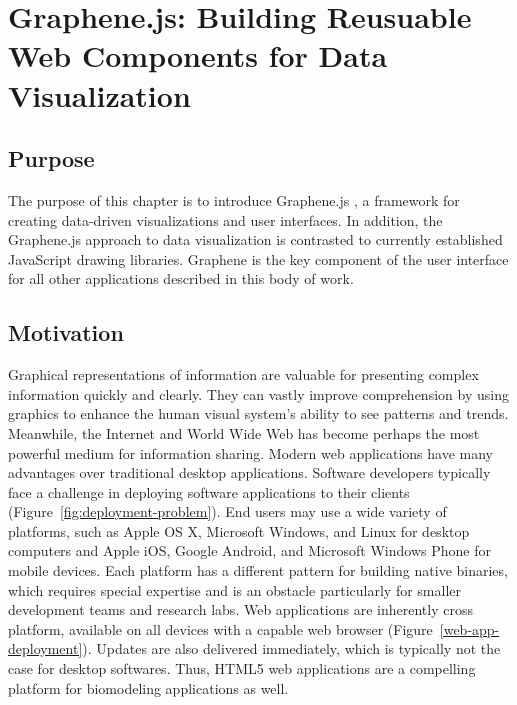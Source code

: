 \chapter{Graphene.js: Building Reusuable Web Components for Data Visualization}

\section{Purpose}

The purpose of this chapter is to introduce Graphene.js \autocite{gu2014graphene}, a framework for creating data-driven visualizations and user interfaces.
In addition, the Graphene.js approach to data visualization is contrasted to currently established JavaScript drawing libraries.
Graphene is the key component of the user interface for all other applications described in this body of work.

\section{Motivation}

Graphical representations of information are valuable for presenting complex information quickly and clearly. \autocite{newsom2007public, smiciklas2012power}
They can vastly improve comprehension by using graphics to enhance the human visual system’s ability to see patterns and trends. \autocite{heer2010tour, sears2007human}
Meanwhile, the Internet and World Wide Web \autocite{berners2000weaving} has become perhaps the most powerful medium for information sharing. \autocite{bollacker1998citeseer, wilkinson2003motivations, page1999pagerank}
Modern web applications have many advantages over traditional desktop applications.
Software developers typically face a challenge in deploying software applications to their clients (Figure~\ref{fig:deployment-problem}).
End users may use a wide variety of platforms, such as Apple OS X, Microsoft Windows, and Linux for desktop computers and Apple iOS, Google Android, and Microsoft Windows Phone for mobile devices.
Each platform has a different pattern for building native binaries, which requires special expertise and is an obstacle particularly for smaller development teams and research labs.
Web applications are inherently cross platform, available on all devices with a capable web browser (Figure~\ref{web-app-deployment}).
Updates are also delivered immediately, which is typically not the case for desktop softwares.
Thus, HTML5 web applications are a compelling platform for biomodeling applications as well.

